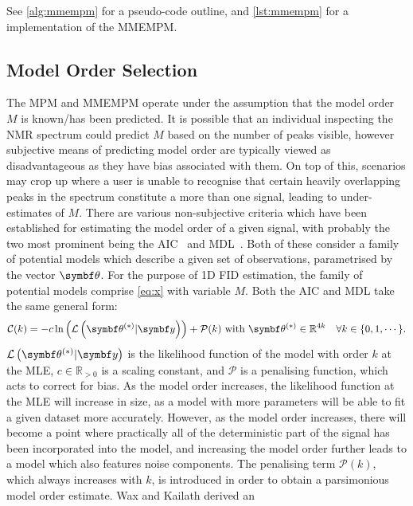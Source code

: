 See \cref{alg:mmempm} for a pseudo-code outline, and \cref{lst:mmempm} for a
\Python implementation of the \ac{MMEMPM}.

\subsection{Model Order Selection}
\label{subsec:model-order}
The \ac{MPM} and \ac{MMEMPM} operate under the assumption that the model order
$M$ is known/has been predicted.
It is possible that an individual inspecting the \ac{NMR} spectrum could
predict $M$ based on the number of peaks visible, however subjective means of
predicting model order are typically viewed as disadvantageous as they have bias
associated with them. On top of this, scenarios may crop up where a user is
unable to recognise that certain heavily overlapping peaks in the spectrum
constitute a more than one signal, leading to under-estimates of $M$.
There are various non-subjective criteria which have been established for
estimating the model order of a given signal, with probably the two most
prominent being the \ac{AIC}~\cite{Akaike1974} and
\ac{MDL}~\cite{Schwarz1978,Rissanen1978}. Both of these consider a family of
potential models which describe a given set of observations, parametrised by
the vector $\bth$. For the purpose of \ac{1D} \ac{FID} estimation, the family
of potential models comprise \cref{eq:x} with variable $M$. Both the \ac{AIC}
and \ac{MDL} take the same general form:
\begin{equation}
    \mathcal{C}(k) = -c \ln \left(\mathcal{L} \left(\bthstar | \by \right)
    \right) + \mathcal{P}(k) \text{ with } \bthstar \in \mathbb{R}^{4k}
    \quad \forall k \in \lbrace 0, 1, \cdots \rbrace.
\end{equation}
 $\mathcal{L} \left(\bthstar |
\by \right)$ is the likelihood
function of the model with order $k$ at the \ac{MLE}, $c \in
\mathbb{R}_{>0}$ is a scaling constant, and $\mathcal{P}$ is a penalising
function, which acts to correct
for bias. As the model order increases, the likelihood function at the \ac{MLE}
will increase in size, as a model with more parameters will be able to fit a
given dataset more accurately. However, as the model order increases, there will
become a point where practically all of the deterministic part of the signal
has been incorporated into the model, and increasing the model order further
leads to a model which also features noise components. The penalising
term $\mathcal{P}(k)$, which always increases with $k$, is introduced in order to
obtain a parsimonious model order estimate. Wax and Kailath derived an
